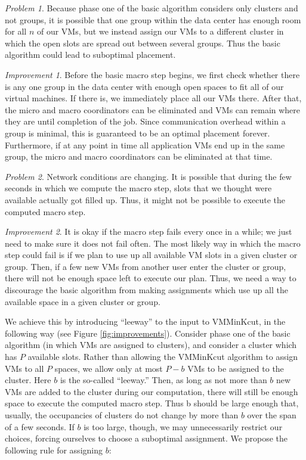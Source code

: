 \documentclass[11pt]{article}
\begin{document}
\begin{trivlist}
\item \textit{Problem 1}. Because phase one of the basic algorithm considers only clusters and not groups, it is possible that one group within the data center has enough room for all $n$ of our VMs, but we instead assign our VMs to a different cluster in which the open slots are spread out between several groups.  Thus the basic algorithm could lead to suboptimal placement.

\item \textit{Improvement 1}. Before the basic macro step begins, we first check whether there is any one group in the data center with enough open spaces to fit all of our virtual machines.  If there is, we immediately place all our VMs there.  After that, the micro and macro coordinators can be eliminated and VMs can remain where they are until completion of the job.  Since communication overhead within a group is minimal, this is guaranteed to be an optimal placement forever.  Furthermore, if at any point in time all application VMs end up in the same group, the micro and macro coordinators can be eliminated at that time.

\item \textit{Problem 2}. Network conditions are changing.  It is possible that during the few seconds in which we compute the macro step, slots that we thought were available actually got filled up.  Thus, it might not be possible to execute the computed macro step.

\item \textit{Improvement 2}. It is okay if the macro step fails every once in a while; we just need to make sure it does not fail often.  The most likely way in which the macro step could fail is if we plan to use up all available VM slots in a given cluster or group.  Then, if a few new VMs from another user enter the cluster or group, there will not be enough space left to execute our plan.  Thus, we need a way to discourage the basic algorithm from making assignments which use up all the available space in a given cluster or group.

  We achieve this by introducing ``leeway'' to the input to VMMinKcut, in the following way (see Figure \ref{fig:improvements}).  Consider phase one of the basic algorithm (in which VMs are assigned to clusters), and consider a cluster which has $P$ available slots.  Rather than allowing the VMMinKcut algorithm to assign VMs to all $P$ spaces, we allow only at most $P-b$ VMs to be assigned to the cluster.  Here $b$ is the so-called ``leeway.''  Then, as long as not more than $b$ new VMs are added to the cluster during our computation, there will still be enough space to execute the computed macro step.  Thus b should be large enough that, usually, the occupancies of clusters do not change by more than $b$ over the span of a few seconds.  If $b$ is too large, though, we may unnecessarily restrict our choices, forcing ourselves to choose a suboptimal assignment.  We propose the following rule for assigning $b$:


\end{trivlist}
\end{document}
